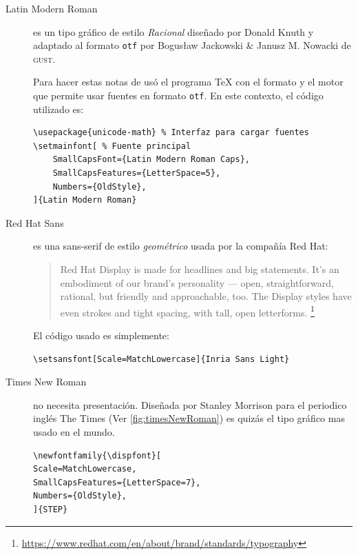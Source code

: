 \begin{description}
\item[Latin Modern Roman]  es un tipo gráfico de estilo \emph{Racional} diseñado por Donald Knuth y adaptado al formato \texttt{otf}
por Bogusław Jackowski \& Janusz M. Nowacki de \textsc{gust}. 


Para hacer estas notas de usó el programa \TeX{} con el formato \LaTeXe{} y el motor \LuaTeX{} que permite usar fuentes en formato
\texttt{otf}. En este contexto, el código utilizado es:

\begin{small}
\begin{verbatim}
\usepackage{unicode-math} % Interfaz para cargar fuentes
\setmainfont[ % Fuente principal
	SmallCapsFont={Latin Modern Roman Caps},
	SmallCapsFeatures={LetterSpace=5},
	Numbers={OldStyle},
]{Latin Modern Roman}
\end{verbatim}

\end{small}

\item[Red Hat Sans] es una sans-serif de estilo \emph{geométrico} usada por la compañía Red Hat:
	\begin{quote}\small
	Red Hat Display is made for headlines and big statements. It’s an embodiment of our brand’s personality — open, straightforward, rational, but friendly and approachable, too. The Display styles have even strokes and tight spacing, with tall, open letterforms.
	\footnote{\url{https://www.redhat.com/en/about/brand/standards/typography}}
	\end{quote}

El código usado es simplemente:

\begin{small}
\begin{verbatim}
\setsansfont[Scale=MatchLowercase]{Inria Sans Light}
\end{verbatim}
\end{small}

\item[Times New Roman] no necesita presentación. Diseñada por Stanley Morrison para el periodico inglés The Times (Ver \cref{fig:timesNewRoman}) es quizás
	el tipo gráfico mas usado en el mundo.



	\begin{verbatim}
\newfontfamily{\dispfont}[
Scale=MatchLowercase,
SmallCapsFeatures={LetterSpace=7},
Numbers={OldStyle},
]{STEP}		
	\end{verbatim}
\end{description}
